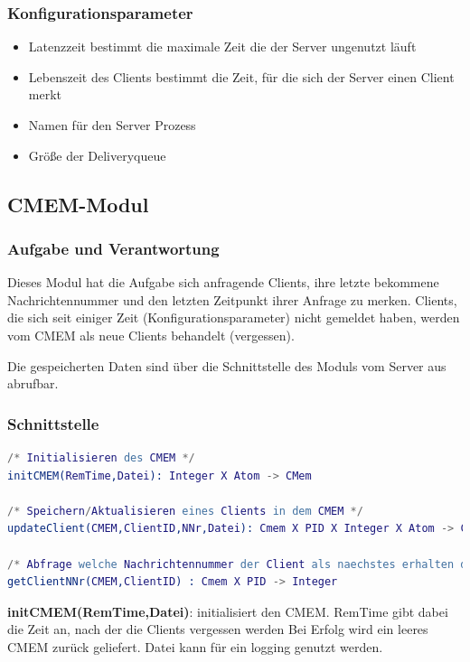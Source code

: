 \documentclass{article}
\begin{document}
\subsubsection{Konfigurationsparameter}
\begin{itemize}
    \item Latenzzeit bestimmt die maximale Zeit die der Server ungenutzt läuft
    \item Lebenszeit des Clients bestimmt die Zeit, für die sich der Server einen Client merkt
    \item Namen für den Server Prozess
    \item Größe der Deliveryqueue
\end{itemize}

\newpage

\subsection{CMEM-Modul}
\subsubsection{Aufgabe und Verantwortung}
Dieses Modul hat die Aufgabe sich anfragende Clients, ihre letzte bekommene Nachrichtennummer und den letzten Zeitpunkt ihrer Anfrage zu merken.
Clients, die sich seit einiger Zeit (Konfigurationsparameter) nicht gemeldet haben, werden vom CMEM als neue Clients behandelt (vergessen).

Die gespeicherten Daten sind über die Schnittstelle des Moduls vom Server aus abrufbar.

\subsubsection{Schnittstelle}
\begin{lstlisting}[language=erlang]
/* Initialisieren des CMEM */
initCMEM(RemTime,Datei): Integer X Atom -> CMem

/* Speichern/Aktualisieren eines Clients in dem CMEM */
updateClient(CMEM,ClientID,NNr,Datei): Cmem X PID X Integer X Atom -> CMem

/* Abfrage welche Nachrichtennummer der Client als naechstes erhalten darf */
getClientNNr(CMEM,ClientID) : Cmem X PID -> Integer
\end{lstlisting}

\textbf{initCMEM(RemTime,Datei)}: initialisiert den CMEM. RemTime gibt dabei die Zeit an, nach der die Clients vergessen werden Bei Erfolg wird ein leeres CMEM zurück geliefert. Datei kann für ein logging genutzt werden.\\
\end{document}
